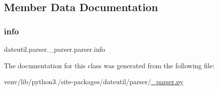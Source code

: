 \subsection{Member Data Documentation}
\mbox{\label{classdateutil_1_1parser_1_1__parser_1_1parser_a27ab986de32c0d0fd240cfd1e3bc085d}} 
\subsubsection{\texorpdfstring{info}{info}}
{\footnotesize\ttfamily dateutil.\+parser.\+\_\+parser.\+parser.\+info}



The documentation for this class was generated from the following file\+:\begin{DoxyCompactItemize}
\item 
venv/lib/python3./site-\/packages/dateutil/parser/\hyperlink{dateutil_2parser_2__parser_8py}{\+\_\+parser.\+py}\end{DoxyCompactItemize}
